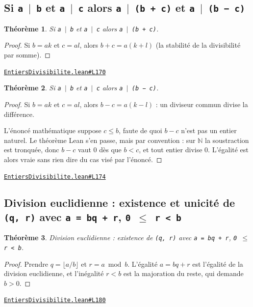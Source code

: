 \documentclass[11pt,a4paper]{article}
\theoremstyle{definition}
\theoremstyle{plain}
\newtheorem{theoreme}{Théorème}
\newcommand{\source}[2]{\par\smallskip\noindent\hfill{\footnotesize\href{#1}{\texttt{#2}}}\par\smallskip}
\begin{document}
\subsection{Si \texttt{a \(\mid\) b} et \texttt{a \(\mid\) c} alors \texttt{a \(\mid\) (b + c)} et \texttt{a \(\mid\) (b − c)}}

\begin{theoreme}
Si \texttt{a \(\mid\) b} et \texttt{a \(\mid\) c} alors \texttt{a \(\mid\) (b + c)}.
\end{theoreme}

\begin{proof}
Si $b = ak$ et $c = al$, alors $b + c = a(k+l)$ (la stabilité de la divisibilité par somme).
\end{proof}
\source{https://github.com/Commutator-IO/learn-lean/blob/main/courses/01-college/01-nombres-et-calculs/EntiersDivisibilite.lean\#L170}{EntiersDivisibilite.lean\#L170}

\begin{theoreme}
Si \texttt{a \(\mid\) b} et \texttt{a \(\mid\) c} alors \texttt{a \(\mid\) (b − c)}.
\end{theoreme}

\begin{proof}
Si $b = ak$ et $c = al$, alors $b - c = a(k - l)$ : un diviseur commun divise la
différence.

L'énoncé mathématique suppose $c \le b$, faute de quoi $b - c$ n'est pas un entier naturel.
Le théorème Lean s'en passe, mais par convention : sur $\mathbb{N}$ la soustraction est
tronquée, donc $b - c$ vaut $0$ dès que $b < c$, et tout entier divise $0$. L'égalité est
alors vraie sans rien dire du cas visé par l'énoncé.
\end{proof}
\source{https://github.com/Commutator-IO/learn-lean/blob/main/courses/01-college/01-nombres-et-calculs/EntiersDivisibilite.lean\#L174}{EntiersDivisibilite.lean\#L174}

\subsection{Division euclidienne : existence et unicité de \texttt{(q, r)} avec \texttt{a = bq + r}, \texttt{0 \(\le\) r < b}}

\begin{theoreme}
Division euclidienne : existence de \texttt{(q, r)} avec \texttt{a = bq + r}, \texttt{0 \(\le\) r < b}.
\end{theoreme}

\begin{proof}
Prendre $q = \lfloor a/b \rfloor$ et $r = a \bmod b$. L'égalité $a = bq + r$ est
l'égalité de la division euclidienne, et l'inégalité $r < b$ est la majoration du reste, qui demande
$b > 0$.
\end{proof}
\source{https://github.com/Commutator-IO/learn-lean/blob/main/courses/01-college/01-nombres-et-calculs/EntiersDivisibilite.lean\#L180}{EntiersDivisibilite.lean\#L180}
\end{document}
